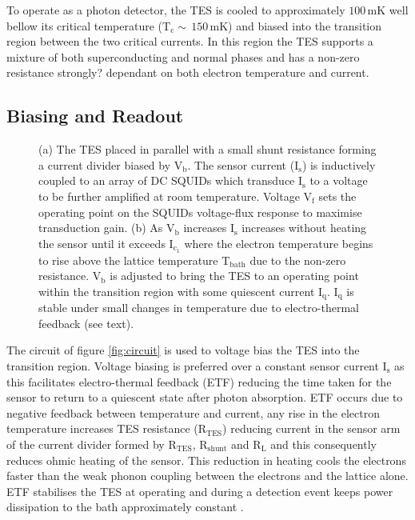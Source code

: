 \documentclass{article}
\begin{document}
\newpage

To operate as a photon detector, the TES is cooled to approximately
$100\,\mathrm{mK}$ well bellow its critical temperature 
($\mathrm{T}_\mathrm{c}\sim\,150\,\mathrm{mK}$) and biased into the transition
region between the two critical currents.
In this region the TES supports a mixture of both superconducting and normal
phases and has a non-zero resistance strongly? dependant on both electron
temperature and current.

\subsection{Biasing and Readout}

\begin{figure}[!hpbt]
  \caption{
    (a) The TES placed in parallel with a small shunt resistance forming a
    current divider biased by $\mathrm{V}_\mathrm{b}$. The sensor
    current ($\mathrm{I}_\mathrm{s}$) is inductively coupled to an array of DC
    SQUIDs which transduce $\mathrm{I}_\mathrm{s}$ to a voltage to be further
    amplified at room temperature. Voltage $\mathrm{V}_\mathrm{f}$ sets the
    operating point on the SQUIDs voltage-flux response to maximise transduction
    gain.
    (b) As $\mathrm{V}_\mathrm{b}$ increases $\mathrm{I}_\mathrm{s}$
    increases without heating the sensor until it
    exceeds $\mathrm{I}_{\mathrm{c}_1}$ where the electron temperature 
    begins to rise above the lattice temperature $\mathrm{T}_\mathrm{bath}$
    due to the non-zero resistance. $\mathrm{V}_\mathrm{b}$ is adjusted to bring
    the TES to an operating point within the transition region with some
    quiescent current $\mathrm{I}_\mathrm{q}$. $\mathrm{I}_\mathrm{q}$ is stable
    under small changes in temperature due to electro-thermal feedback (see
    text).
  }
\end{figure}

The circuit of figure \ref{fig:circuit} is used to voltage bias the TES into the
transition region. 
Voltage biasing is preferred over a constant sensor current
$\mathrm{I}_\mathrm{s}$ as this facilitates electro-thermal feedback (ETF)
reducing the time taken for the sensor to return to a quiescent state after
photon absorption. 
ETF occurs due to negative feedback between temperature and current, any rise
in the electron temperature increases TES resistance
($\mathrm{R}_\mathrm{TES}$) reducing current in the sensor arm of the current
divider formed by $\mathrm{R}_\mathrm{TES}$, $\mathrm{R}_\mathrm{shunt}$ and
$\mathrm{R}_\mathrm{L}$ and this consequently reduces ohmic heating of the
sensor.
This reduction in heating cools the electrons faster than the weak phonon
coupling between the electrons and the lattice alone.
ETF stabilises the TES at operating and during a detection event keeps
power dissipation to the bath approximately constant \cite{SaeWooNam:1999hz}.
\end{document}
